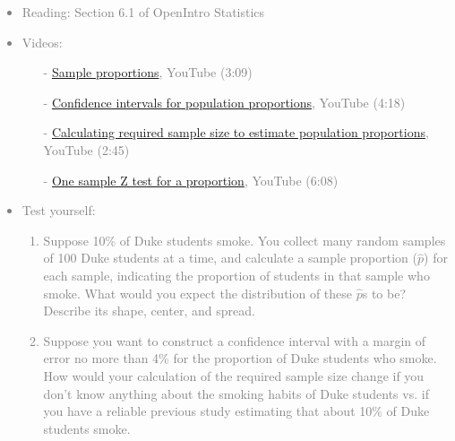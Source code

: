 \documentclass[11pt]{article}
\newcommand{\gray}[1]{\textcolor{gray}{#1}}
\begin{document}
\gray{
{\it
\vspace{-0.55cm}
\begin{itemize}
\renewcommand{\labelitemi}{{\textcolor{dark}{$\ast$}}}
\item Reading: Section 6.1 of OpenIntro Statistics
\item Videos: 
\begin{itemize}
\item[-] \href{http://www.youtube.com/watch?v=MWff4_ORZjM}{Sample proportions}, YouTube (3:09)
\item[-] \href{http://www.youtube.com/watch?v=3ReWri_jh3M}{Confidence intervals for population proportions}, YouTube (4:18)
\item[-] \href{http://www.youtube.com/watch?v=OyuQn-P8iQ0}{Calculating required sample size to estimate population proportions}, YouTube (2:45)
\item[-] \href{http://www.youtube.com/watch?v=dH6igFVoCAw}{One sample Z test for a proportion}, YouTube (6:08)
\end{itemize}
\item Test yourself:
\begin{enumerate}
\item Suppose 10\% of Duke students smoke. You collect many random samples of 100 Duke students at a time, and calculate a sample proportion ($\hat{p}$) for each sample, indicating the proportion of students in that sample who smoke. What would you expect the distribution of these $\hat{p}$s to be? Describe its shape, center, and spread.
\item Suppose you want to construct a confidence interval with a margin of error no more than 4\% for the proportion of Duke students who smoke. How would your calculation of the required sample size change if you don't know anything about the smoking habits of Duke students vs. if you have a reliable previous study estimating that about 10\% of Duke students smoke.
\end{enumerate}
\end{itemize}
}}

%

\vspace{0.48cm}
\end{document}
